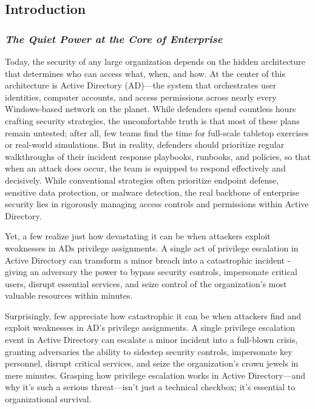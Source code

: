 \subsection{Introduction}

\subsubsection{\textit{The Quiet Power at the Core of Enterprise}}

Today, the security of any large organization depends on the hidden architecture that determines who can access what, when, and how. At the center of this architecture is Active Directory (AD)—the system that orchestrates user identities, computer accounts, and access permissions across nearly every Windows-based network on the planet. While defenders spend countless hours crafting security strategies, the uncomfortable truth is that most of these plans remain untested; after all, few teams find the time for full-scale tabletop exercises or real-world simulations. But in reality, defenders should prioritize regular walkthroughs of their incident response playbooks, runbooks, and policies, so that when an attack does occur, the team is equipped to respond effectively and decisively. While conventional strategies often prioritize endpoint defense, sensitive data protection, or malware detection, the real backbone of enterprise security lies in rigorously managing access controls and permissions within Active Directory.

Yet, a few realize just how devastating it can be when attackers exploit weaknesses in ADs privilege assignments. A single act of privilege escalation in Active Directory can transform a minor breach into a catastrophic incident - giving an adversary the power to bypass security controls, impersonate critical users, disrupt essential services, and seize control of the organization’s most valuable resources within minutes.

Surprisingly, few appreciate how catastrophic it can be when attackers find and exploit weaknesses in AD’s privilege assignments. A single privilege escalation event in Active Directory can escalate a minor incident into a full-blown crisis, granting adversaries the ability to sidestep security controls, impersonate key personnel, disrupt critical services, and seize the organization’s crown jewels in mere minutes. Grasping how privilege escalation works in Active Directory—and why it’s such a serious threat—isn’t just a technical checkbox; it’s essential to organizational survival.

